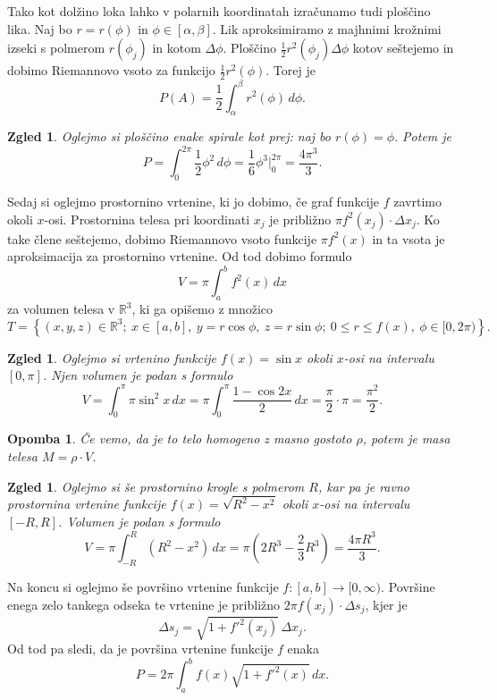\documentclass[10pt, a4paper]{article}
\newtheorem*{opomba}{Opomba}
\newtheorem{zgled}[izr]{Zgled}
\newcommand{\R}{\mathbb {R}}
\begin{document}
Tako kot dolžino loka lahko v polarnih koordinatah izračunamo tudi ploščino lika.
Naj bo $r = r(\phi)$ in $\phi \in [\alpha, \beta]$.
Lik aproksimiramo z majhnimi krožnimi izseki s polmerom $r (\phi_j)$ in kotom $\Delta \phi$.
Ploščino $\frac{1}{2} r^2(\phi_j) \Delta \phi$ kotov seštejemo in dobimo Riemannovo vsoto za funkcijo $\frac{1}{2} r^2 (\phi)$.
Torej je $$P(A) = \frac{1}{2} \int_\alpha ^\beta r^2 (\phi)\,d\phi.$$

\begin{zgled}
    Oglejmo si ploščino enake spirale kot prej: naj bo $r(\phi) = \phi.$
    Potem je $$P = \int_0 ^{2\pi} \frac{1}{2} \phi^2\,d\phi = \frac{1}{6} \phi^3 \big|_0 ^{2\pi} = \frac{4\pi^3}{3}.$$
\end{zgled}

Sedaj si oglejmo prostornino vrtenine, ki jo dobimo, če graf funkcije $f$ zavrtimo okoli $x$-osi.
Prostornina telesa pri koordinati $x_j$ je približno $\pi f^2 (x_j) \cdot \Delta x_j$.
Ko take člene seštejemo, dobimo Riemannovo vsoto funkcije $\pi f^2(x)$ in ta vsota je aproksimacija za prostornino vrtenine.
Od tod dobimo formulo $$V = \pi \int_a ^b f^2 (x)\,dx$$ za volumen telesa v $\R^3$, ki ga opišemo z množico
$$T = \left\lbrace (x,y,z) \in \R^3;\ x \in [a, b],\ y = r \cos \phi,\ z = r \sin \phi;\ 0 \leq r \leq f(x),\ \phi \in [0, 2 \pi) \right\rbrace.$$
\begin{zgled}
    Oglejmo si vrtenino funkcije $f(x) = \sin x$ okoli $x$-osi na intervalu $[0, \pi]$.
    Njen volumen je podan s formulo $$V = \int_0 ^\pi \pi \sin^2 x\,dx = \pi \int_0 ^\pi \frac{1 - \cos{2x}}{2}\,dx = \frac{\pi}{2} \cdot \pi = \frac{\pi^2}{2}.$$
\end{zgled}

\begin{opomba}
    Če vemo, da je to telo homogeno z masno gostoto $\rho$, potem je masa telesa $M = \rho \cdot V$.
\end{opomba}

\begin{zgled}
    Oglejmo si še prostornino krogle s polmerom $R$, kar pa je ravno prostornina vrtenine funkcije $f(x) = \sqrt{R^2 - x^2}$ okoli $x$-osi na intervalu $[-R, R]$.
    Volumen je podan s formulo $$V = \pi \int_{-R} ^R (R^2 - x^2)\,dx = \pi (2R^3 - \frac{2}{3}R^3) = \frac{4 \pi R^3}{3}.$$
\end{zgled}

Na koncu si oglejmo še površino vrtenine funkcije $f: [a, b] \rightarrow [0, \infty).$
Površine enega zelo tankega odseka te vrtenine je približno $2 \pi f(x_j) \cdot \Delta s_j$, kjer je 
$$\Delta s_j = \sqrt{1 + f'^2(x_j)}\,\Delta x_j.$$ Od tod pa sledi, da je površina vrtenine funkcije $f$ enaka 
$$P = 2 \pi \int_a ^b f(x) \sqrt{1 + f'^2(x)}\,dx.$$
\end{document}
